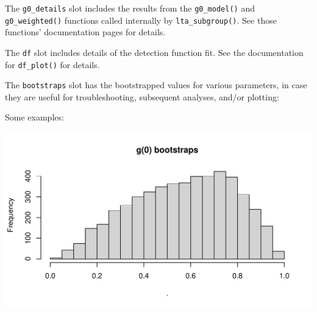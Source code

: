 \documentclass[
]{book}
\newenvironment{Shaded}{\begin{snugshade}}{\end{snugshade}}
\newcommand{\DecValTok}[1]{\textcolor[rgb]{0.00,0.00,0.81}{#1}}
\newcommand{\NormalTok}[1]{#1}
\newcommand{\SpecialCharTok}[1]{\textcolor[rgb]{0.81,0.36,0.00}{\textbf{#1}}}
\newcommand{\StringTok}[1]{\textcolor[rgb]{0.31,0.60,0.02}{#1}}
\begin{document}
The \texttt{g0\_details} slot includes the results from the \texttt{g0\_model()} and \texttt{g0\_weighted()} functions called internally by \texttt{lta\_subgroup()}. See those functions' documentation pages for details.

\begin{Shaded}
\end{Shaded}

The \texttt{df} slot includes details of the detection function fit. See the documentation for \texttt{df\_plot()} for details.

\begin{Shaded}
\end{Shaded}

The \texttt{bootstraps} slot has the bootstrapped values for various parameters, in case they are useful for troubleshooting, subsequent analyses, and/or plotting:

\begin{Shaded}
\end{Shaded}

Some examples:

\includegraphics{figures/unnamed-chunk-308-1.pdf}
\end{document}
